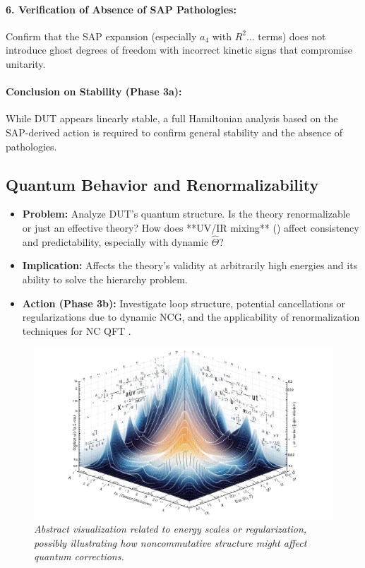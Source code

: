 \documentclass[11pt, a4paper]{article}
\theoremstyle{remark}
\newcommand{\Op}[1]{\hat{#1}}
\begin{document}
\paragraph{6. Verification of Absence of SAP Pathologies:} Confirm that the SAP expansion (especially \( a_4 \) with \( R^2 \dots \) terms) does not introduce ghost degrees of freedom with incorrect kinetic signs that compromise unitarity.

\paragraph{Conclusion on Stability (Phase 3a):} While DUT appears linearly stable, a full Hamiltonian analysis based on the SAP-derived action is required to confirm general stability and the absence of pathologies.

\subsection{Quantum Behavior and Renormalizability}
\label{subsec:quantum_behavior_detailed}
\begin{itemize}
    \item \textbf{Problem:} Analyze DUT's quantum structure. Is the theory renormalizable or just an effective theory? How does **UV/IR mixing** () affect consistency and predictability, especially with dynamic \( \Op{\Theta} \)?
    \item \textbf{Implication:} Affects the theory's validity at arbitrarily high energies and its ability to solve the hierarchy problem.
    \item \textbf{Action (Phase 3b):} Investigate loop structure, potential cancellations or regularizations due to dynamic NCG, and the applicability of renormalization techniques for NC QFT \citep{GrosseWulkenhaar2005, Rivasseau:2010}.
\end{itemize}

\begin{figure}[htbp]
    \centering
    \includegraphics[width=0.6\linewidth]{OIG36.ZNLJ.PNG}
    \caption{%
     \footnotesize\textit{Abstract visualization related to energy scales or regularization, possibly illustrating how noncommutative structure might affect quantum corrections.}
    }
    \label{fig:Figura18}
\end{figure}
\end{document}
